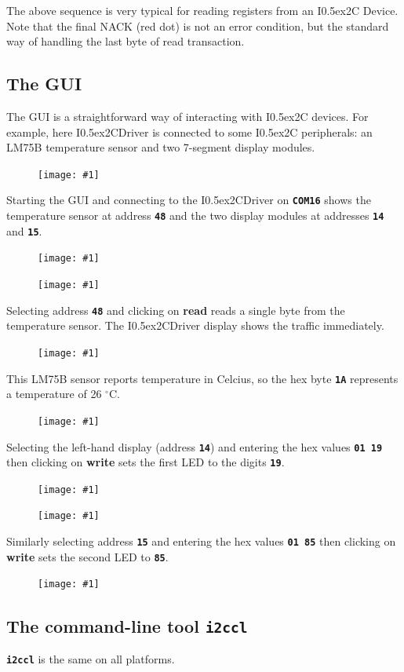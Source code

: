 \documentclass{article}
\newcommand{\two}{\raise0.5ex\hbox{\footnotesize{2}}}
\newcommand{\iic}{I\two{}C}
\newcommand{\iicdriver}{I\two{}CDriver}
\newcommand{\degc}{$^{\circ}$C}
\newcommand{\png}[1]{
\begin{figure}[H]
\begin{center}
\texttt{[image: \#1]}
\end{center}
\end{figure}
}
\newcommand{\pngw}[2]{
\begin{figure}[H]
\begin{center}
\texttt{[image: \#1]}
\end{center}
\end{figure}
}
\newcommand{\mach}[1]{\texttt{\textbf{#1}}}
\begin{document}
The above sequence is very typical for reading registers from an \iic{} Device.
Note that the final NACK (red dot) is not an error condition, but the standard way of handling the last byte of read transaction.

\newpage
\subsection{The GUI}

The GUI is a straightforward way of interacting with \iic{} devices.
For example,
here \iicdriver{} is connected to some
\iic{} peripherals: an LM75B temperature sensor and two 7-segment display modules.

\png{img/i2cdriver/DSC_6031.JPG}

Starting the GUI and connecting to the \iicdriver{} on \mach{COM16}
shows the temperature sensor at address \mach{48}
and the two display modules at addresses \mach{14} and \mach{15}.

\pngw{img/i2cdriver/ss-0}{0.65}

\png{img/i2cdriver/ss-1}

Selecting address \mach{48} and clicking on \textbf{read}
reads a single byte from the temperature sensor.
The \iicdriver{} display shows the traffic immediately.

\png{img/i2cdriver/DSC_6032.JPG}

This LM75B sensor reports temperature in Celcius, so the hex byte \mach{1A} represents a temperature of 26 \degc.

\newpage
\png{img/i2cdriver/ss-3}

Selecting the left-hand display (address \mach{14}) and entering the hex values \mach{01 19}
then clicking on \textbf{write} sets the first LED to the digits \mach{19}.

\png{img/i2cdriver/DSC_6033.JPG}

\png{img/i2cdriver/ss-4}

Similarly selecting address \mach{15} and entering the hex values \mach{01 85}
then clicking on \textbf{write} sets the second LED to \mach{85}.

\png{img/i2cdriver/DSC_6034.JPG}

\newpage
\subsection{The command-line tool \mach{i2ccl}}

\mach{i2ccl} is the same on all platforms.
\end{document}
